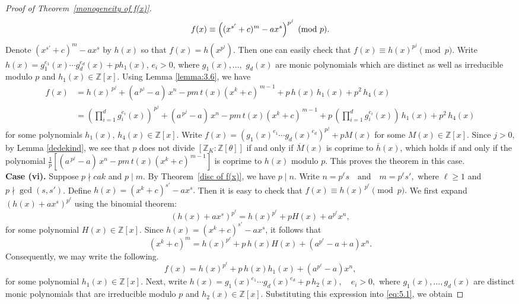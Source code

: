 \documentclass[10pt,a4paper]{amsart}
\newcommand{\Z}{\mathbb{Z}}
\begin{document}
\begin{proof}[Proof of Theorem~\ref{monogeneity of f(x)}]
\[
f(x) \equiv \Bigl( (x^{s'} + c)^m - a x^s \Bigr)^{p^{j}} \pmod{p}.
\]
 Denote  $ (x^{s'} + c)^m - a x^s$ by $h(x)$ so that $f(x)=h(x^{p^j})$. Then one can easily check that $f(x)\equiv h(x)^{p^j} \pmod{p}$. Write $h(x) = g^{e_1}_1(x)\cdots g^{e_d}_d(x) + ph_1(x)$, $e_i>0$, where $g_1(x), \ldots,$ $g_d(x)$ are monic polynomials which are distinct as well as irreducible modulo $p$ and $h_1(x) \in \Z[x]$. Using Lemma \ref{lemma:3.6}, we have
\begin{align*}
    f(x) &=  h(x)^{\,p^{j}}+(a^{\,p^{j}} - a)\,x^{n} - p m\, t(x)(x^{k} + c)^{\,m-1}+ p\,h(x)\,h_{1}(x) + p^{2}\,h_{4}(x)\\
    &=\left(\prod\limits_{i=1}^{d}g^{e_i}_i(x)\right)^{\,p^j}+(a^{\,p^{j}} - a)\,x^{n} - p m\, t(x)(x^{k} + c)^{\,m-1}+ p\,\left(\prod\limits_{i=1}^{d}g^{e_i}_i(x)\right)\,h_{1}(x) + p^{2}\,h_{4}(x)
\end{align*}
for some polynomials $h_1(x),\,h_4(x)\in\Z[x]$. Write $f(x)=\left(g_1(x)^{e_1} \cdots g_d(x)^{e_d}\right)^{p^j}+p M(x)$ for some $M(x)\in\Z[x].$ Since  $j>0$, by Lemma \ref{dedekind}, we see that $p$ does not divide $[\Z_K :\Z[\theta]]$ if and only if $\overline{M}(x)$ is coprime to $\overline{h}(x)$, which holds if and only if the polynomial $\frac{1}{p}[(a^{\,p^{j}} - a)\,x^{n} - p m\, t(x)(x^{k} + c)^{\,m-1}]$ is coprime to $h(x)$ modulo $p$. This proves the theorem in this case.\\[2mm]
\textbf{Case (vi).} Suppose $p \nmid cak$ and $p \mid m$. By Theorem~\ref{disc of f(x)}, we have $p \mid n$. Write $n = p^{\ell}s \quad \text{and} \quad m = p^{\ell}s',$ where $\ell \ge 1$ and $p \nmid \gcd(s,s')$. Define $h(x) = (x^{k}+c)^{s'} - a x^{s}.$ Then it is easy to check that $f(x) \equiv h(x)^{\,p^{\ell}} \pmod{p}.$
We first expand $(h(x)+a x^{s})^{p^{\ell}}$ using the binomial theorem:
\[
(h(x)+a x^{s})^{p^{\ell}} = h(x)^{p^{\ell}} + pH(x) + a^{p^{\ell}}x^{n},
\]
for some polynomial $H(x)\in\mathbb{Z}[x]$. Since $h(x)=(x^{k}+c)^{s'}-a x^{s}$, it follows that
\[
(x^{k}+c)^{m}
= h(x)^{p^{\ell}} + p\,h(x)H(x) + (a^{p^{\ell}}-a+a)x^{n}.
\]
Consequently, we may write the following.
\begin{equation}\label{eq:5.1}
f(x) = h(x)^{p^{\ell}} + p\,h(x)h_{1}(x) + (a^{p^{\ell}}-a)x^{n},
\end{equation}
for some polynomial $h_{1}(x)\in\mathbb{Z}[x]$. Next, write $h(x)=g_{1}(x)^{e_{1}}\cdots g_{d}(x)^{e_{d}} + p\,h_{2}(x),
\quad e_i>0,$ where $g_{1}(x),\ldots,g_{d}(x)$ are distinct monic polynomials that are irreducible modulo $p$ and $h_{2}(x)\in\mathbb{Z}[x]$. Substituting this expression into \eqref{eq:5.1}, we obtain

\end{proof}
\end{document}
